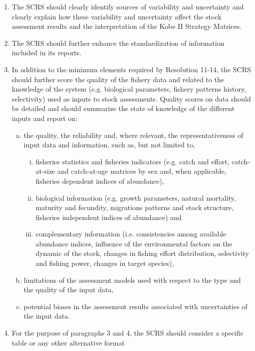 \documentclass[a4paper,10pt]{article}
\begin{document}
 \begin{enumerate}
  \item The SCRS should clearly identify sources of variability and uncertainty and clearly explain how these variability and uncertainty 
        affect the stock assessment results and the interpretation of the Kobe II Strategy Matrices. 
  \item The SCRS should further enhance the standardization of information included in its reports.
  \item In addition to the minimum elements required by Resolution 11-14, the SCRS should further score the quality of the fishery 
        data and related to the knowledge of the system (e.g. biological parameters, fishery patterns history, selectivity) used as 
        inputs to stock assessments. Quality scores on data should be detailed and should summarize the state of knowledge of the 
        different inputs and report on:
  \begin{enumerate}[(a)]
    \item the quality, the reliability and, where relevant, the representativeness of input data and information, such as, but 
          not limited to, 
      \begin{enumerate}[(i)]
      \item fisheries statistics and fisheries indicators (e.g. catch and effort, catch-at-size and catch-at-age matrices 
          by sex and, when applicable, fisheries dependent indices of abundance), 
      \item biological information (e.g. growth parameters, 
          natural mortality, maturity and fecundity, migrations patterns and stock structure, fisheries independent indices of abundance) 
          and 
      \item complementary information (i.e. consistencies among available abundance indices, influence of the environmental factors 
          on the dynamic of the stock, changes in fishing effort distribution, selectivity and fishing power, changes in target species),
    \end{enumerate}
    \item limitations of the assessment models used with respect to the type and the quality of the input data,
    \item potential biases in the assessment results associated with uncertainties of the input data.
  \end{enumerate}
  \item For the purpose of paragraphs 3 and 4, the SCRS should consider a specific table or any other alternative format 

\end{enumerate}
\end{document}
